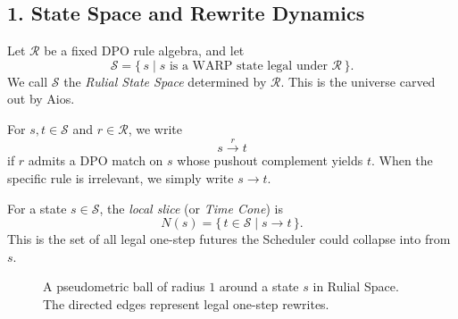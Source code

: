 \vspace{1em}

\subsection*{1. State Space and Rewrite Dynamics}

\begin{definition}
Let $\mathcal{R}$ be a fixed DPO rule algebra, and let
\[
\mathcal{S} = \{\, s \mid s \text{ is a WARP state legal under } \mathcal{R} \,\}.
\]
We call $\mathcal{S}$ the \emph{Rulial State Space} determined by $\mathcal{R}$. This is the universe carved out by Aios.
\end{definition}

\begin{definition}
For $s, t \in \mathcal{S}$ and $r \in \mathcal{R}$, we write
\[
s \xrightarrow{r} t
\]
if $r$ admits a DPO match on $s$ whose pushout complement yields $t$. When the specific rule is irrelevant, we simply write $s \to t$.
\end{definition}

\begin{definition}
For a state $s \in \mathcal{S}$, the \emph{local slice} (or \emph{Time Cone}) is
\[
N(s) = \{\, t \in \mathcal{S} \mid s \to t \,\}.
\]
This is the set of all legal one-step futures the Scheduler could collapse into from $s$.
\end{definition}

\begin{figure}[h]
\centering
{}
\caption{A pseudometric ball of radius $1$ around a state $s$ in Rulial Space. The directed edges represent legal one-step rewrites.}
\label{fig:rulial-ball}
\end{figure}

